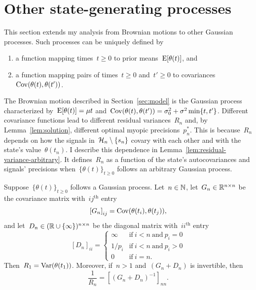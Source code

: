 \documentclass[11pt,oneside]{article}
\begin{document}
\section{Other state-generating processes}
\label{sec:other-processes}

This section extends my analysis from Brownian motions to other Gaussian processes.
Such processes can be uniquely defined by
%
\begin{enumerate}

    \item[(i)]
    a function mapping times~$t\ge0$ to prior means~$\operatorname{E}[\theta(t)]$, and

    \item[(ii)]
    a function mapping pairs of times~$t\ge0$ and~$t'\ge0$ to covariances~$\operatorname{Cov}(\theta(t),\theta(t'))$.

\end{enumerate}
%
The Brownian motion described in Section~\ref{sec:model} is the Gaussian process characterized by~$\operatorname{E}[\theta(t)]=\mu t$ and~$\operatorname{Cov}(\theta(t),\theta(t'))=\sigma_0^2+\sigma^2\min\{t,t'\}$.
Different covariance functions lead to different residual variances~$R_n$ and, by Lemma~\ref{lem:solution}, different optimal myopic precisions~$p_n^*$.
This is because~$R_n$ depends on how the signals in~$\mathcal{H}_n\setminus\{s_n\}$ covary with each other and with the state's value~$\theta(t_n)$.
I describe this dependence in Lemma~\ref{lem:residual-variance-arbitrary}.
It defines~$R_n$ as a function of the state's autocovariances and signals' precisions when~$\{\theta(t)\}_{t\ge0}$ follows an arbitrary Gaussian process.

\begin{lemma}
    \label{lem:residual-variance-arbitrary}
    Suppose~$\{\theta(t)\}_{t\ge0}$ follows a Gaussian process.
    Let~$n\in\mathbb{N}$, let~$G_n\in\mathbb{R}^{n\times n}$ be the covariance matrix with~${ij}^\text{th}$ entry
    \[ \left[G_n\right]_{ij}=\Cov(\theta(t_i),\theta(t_j)), \]
    and let~$D_n\in(\mathbb{R}\cup\{\infty\})^{n\times n}$ be the diagonal matrix with~${ii}^\text{th}$ entry
    \[ \left[D_n\right]_{ii}=\begin{cases}
        \infty & \text{if}\ i<n\ \text{and}\ p_i=0 \\
        1/p_i & \text{if}\ i<n\ \text{and}\ p_i>0 \\
        0 & \text{if}\ i=n.
    \end{cases} \]
    Then~$R_1=\operatorname{Var}(\theta(t_1))$.
    Moreover, if~$n>1$ and~$(G_n+D_n)$ is invertible, then
    \[ \frac{1}{R_n}=\left[\left(G_n+D_n\right)^{-1}\right]_{nn}. \]
\end{lemma}
%
\end{document}
